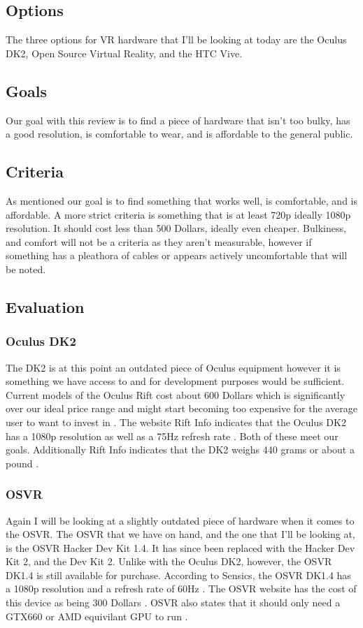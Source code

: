 \documentclass{article}
\begin{document}
\subsection{Options}
The three options for VR hardware that I'll be looking at today are the Oculus DK2, Open Source Virtual Reality, and the HTC Vive.

\subsection{Goals}
Our goal with this review is to find a piece of hardware that isn't too bulky, has a good resolution, is comfortable to wear, and is affordable to the general public.

\subsection{Criteria}
As mentioned our goal is to find something that works well, is comfortable, and is affordable. 
A more strict criteria is something that is at least 720p ideally 1080p resolution.
It should cost less than 500 Dollars, ideally even cheaper.
Bulkiness, and comfort will not be a criteria as they aren't measurable, however if something has a pleathora of cables or appears actively uncomfortable that will be noted.

\subsection{Evaluation}
\subsubsection{Oculus DK2}
The DK2 is at this point an outdated piece of Oculus equipment however it is something we have access to and for development purposes would be sufficient. 
Current models of the Oculus Rift cost about 600 Dollars which is significantly over our ideal price range and might start becoming too expensive for the average user to want to invest in \cite{oculushardware}. 
The website Rift Info indicates that the Oculus DK2 has a 1080p resolution as well as a 75Hz refresh rate \cite{riftinfo}.
Both of these meet our goals.
Additionally Rift Info indicates that the DK2 weighs 440 grams or about a pound \cite{riftinfo}.

\subsubsection{OSVR}
Again I will be looking at a slightly outdated piece of hardware when it comes to the OSVR. 
The OSVR that we have on hand, and the one that I'll be looking at, is the OSVR Hacker Dev Kit 1.4. 
It has since been replaced with the Hacker Dev Kit 2, and the Dev Kit 2.
Unlike with the Oculus DK2, however, the OSVR DK1.4 is still available for purchase.
According to Sensics, the OSVR DK1.4 has a 1080p resolution and a refresh rate of 60Hz \cite{sensicsosvr}.
The OSVR website has the cost of this device as being 300 Dollars \cite{osvrhardware}.
OSVR also states that it should only need a GTX660 or AMD equivilant GPU to run \cite{osvrhardware}.
\end{document}
